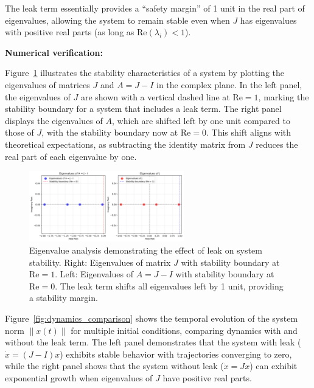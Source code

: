 \documentclass[11pt]{article}
\begin{document}
The leak term essentially provides a ``safety margin'' of 1 unit in the real part of eigenvalues, allowing the system to remain stable even when $J$ has eigenvalues with positive real parts (as long as $\text{Re}(\lambda_i) < 1$).




\textbf{Numerical verification:}

Figure~\ref{fig:eigenvalue_analysis} illustrates the stability characteristics of a system by plotting the eigenvalues of matrices $J$ and $A = J - I$ in the complex plane. In the left panel, the eigenvalues of $J$ are shown with a vertical dashed line at $\text{Re} = 1$, marking the stability boundary for a system that includes a leak term. The right panel displays the eigenvalues of $A$, which are shifted left by one unit compared to those of $J$, with the stability boundary now at $\text{Re} = 0$. This shift aligns with theoretical expectations, as subtracting the identity matrix from $J$ reduces the real part of each eigenvalue by one.

\begin{figure}[h]
\centering
\includegraphics[width=0.6\textwidth]{eigenvalues_comparison.png}
\caption{Eigenvalue analysis demonstrating the effect of leak on system stability. Right: Eigenvalues of matrix $J$ with stability boundary at $\text{Re} = 1$. Left: Eigenvalues of $A = J - I$ with stability boundary at $\text{Re} = 0$. The leak term shifts all eigenvalues left by 1 unit, providing a stability margin.}
\label{fig:eigenvalue_analysis}
\end{figure}


Figure~\ref{fig:dynamics_comparison} shows the temporal evolution of the system norm $\|x(t)\|$ for multiple initial conditions, comparing dynamics with and without the leak term. The left panel demonstrates that the system with leak ($\dot{x} = (J-I)x$) exhibits stable behavior with trajectories converging to zero, while the right panel shows that the system without leak ($\dot{x} = Jx$) can exhibit exponential growth when eigenvalues of $J$ have positive real parts.
\end{document}
